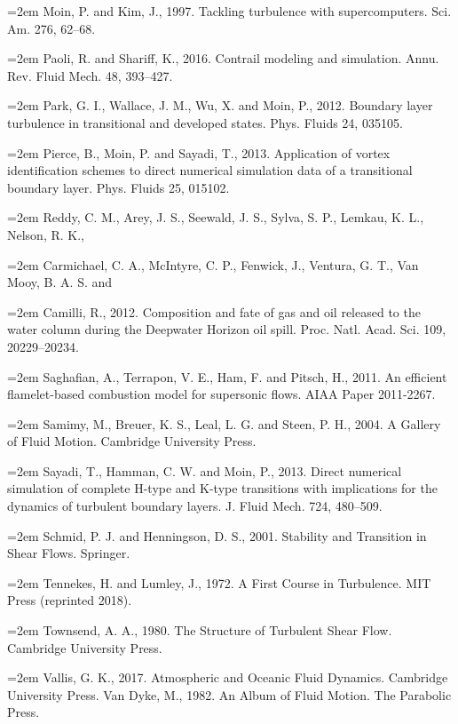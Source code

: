 \documentclass[12pt,a4paper,openany,fontset=none]{ctexbook}
\begin{document}
\par\hangindent=2em Moin, P. and Kim, J., 1997. Tackling turbulence with supercomputers. Sci. Am. 276, 62–68.
\par\hangindent=2em Paoli, R. and Shariff, K., 2016. Contrail modeling and simulation. Annu. Rev. Fluid Mech. 48, 393–427.
\par\hangindent=2em Park, G. I., Wallace, J. M., Wu, X. and Moin, P., 2012. Boundary layer turbulence in transitional and developed states. Phys. Fluids 24, 035105.
\par\hangindent=2em Pierce, B., Moin, P. and Sayadi, T., 2013. Application of vortex identification schemes to direct numerical simulation data of a transitional boundary layer. Phys. Fluids 25, 015102.
\par\hangindent=2em Reddy, C. M., Arey, J. S., Seewald, J. S., Sylva, S. P., Lemkau, K. L., Nelson, R. K.,
\par\hangindent=2em Carmichael, C. A., McIntyre, C. P., Fenwick, J., Ventura, G. T., Van Mooy, B. A. S. and
\par\hangindent=2em Camilli, R., 2012. Composition and fate of gas and oil released to the water column during the Deepwater Horizon oil spill. Proc. Natl. Acad. Sci. 109, 20229–20234.
\par\hangindent=2em Saghafian, A., Terrapon, V. E., Ham, F. and Pitsch, H., 2011. An efficient flamelet-based combustion model for supersonic flows. AIAA Paper 2011-2267.
\par\hangindent=2em Samimy, M., Breuer, K. S., Leal, L. G. and Steen, P. H., 2004. A Gallery of Fluid Motion. Cambridge University Press.
\par\hangindent=2em Sayadi, T., Hamman, C. W. and Moin, P., 2013. Direct numerical simulation of complete H-type and K-type transitions with implications for the dynamics of turbulent boundary layers. J. Fluid Mech. 724, 480–509.
\par\hangindent=2em Schmid, P. J. and Henningson, D. S., 2001. Stability and Transition in Shear Flows. Springer.
\par\hangindent=2em Tennekes, H. and Lumley, J., 1972. A First Course in Turbulence. MIT Press (reprinted 2018).
\par\hangindent=2em Townsend, A. A., 1980. The Structure of Turbulent Shear Flow. Cambridge University Press.
\par\hangindent=2em Vallis, G. K., 2017. Atmospheric and Oceanic Fluid Dynamics. Cambridge University Press. Van Dyke, M., 1982. An Album of Fluid Motion. The Parabolic Press.
\end{document}

